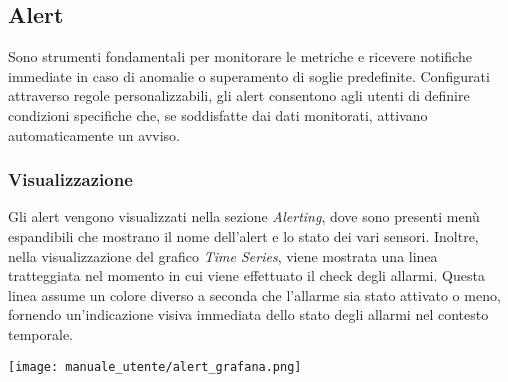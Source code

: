 
\subsection{Alert}
Sono strumenti fondamentali per monitorare le metriche e ricevere notifiche immediate in caso di anomalie o superamento di soglie predefinite. Configurati attraverso regole personalizzabili, gli alert consentono agli utenti di definire condizioni specifiche che, se soddisfatte dai dati monitorati, attivano automaticamente un avviso.
\subsubsection{Visualizzazione}
Gli alert vengono visualizzati nella sezione \textit{Alerting}, dove sono presenti menù espandibili che mostrano il nome dell'alert e lo stato dei vari sensori. Inoltre, nella visualizzazione del grafico \textit{Time Series}, viene mostrata una linea tratteggiata nel momento in cui viene effettuato il check degli allarmi. Questa linea assume un colore diverso a seconda che l'allarme sia stato attivato o meno, fornendo un'indicazione visiva immediata dello stato degli allarmi nel contesto temporale.

\begin{center}
    \texttt{[image: manuale\_utente/alert\_grafana.png]}
\end{center} 

